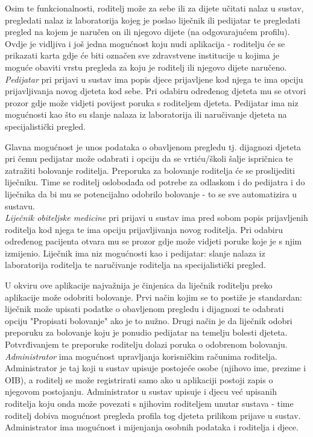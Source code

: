 		Osim te funkcionalnosti, roditelj može za sebe ili za dijete učitati nalaz u sustav, pregledati nalaz iz laboratorija kojeg je poslao liječnik ili pedijatar te pregledati pregled na kojem je naručen on ili njegovo dijete (na odgovarajućem profilu). Ovdje je vidljiva i još jedna mogućnost koju nudi aplikacija - roditelju će se prikazati karta gdje će biti označen sve zdravstvene institucije u kojima je moguće obaviti vrstu pregleda za koju je roditelj ili njegovo dijete naručeno.\\
		
		
		\textit{Pedijatar} pri prijavi u sustav ima popis djece prijavljene kod njega te ima opciju prijavljivanja novog djeteta kod sebe. Pri odabiru određenog djeteta mu se otvori prozor gdje može vidjeti povijest poruka s roditeljem djeteta. Pedijatar ima niz mogućnosti kao što su slanje nalaza iz laboratorija ili naručivanje djeteta na specijalistički pregled. 
		
		Glavna mogućnost je unos podataka o obavljenom pregledu tj. dijagnozi djeteta pri čemu pedijatar može odabrati i opciju da se vrtiću/školi šalje ispričnica te zatražiti bolovanje roditelja. Preporuka za bolovanje roditelja će se proslijediti liječniku. Time se roditelj oslobodađa od potrebe za odlaskom i do pedijatra i do liječnika da bi mu se potencijalno odobrilo bolovanje - to se sve automatizira u sustavu.\\
		
		
		\textit{Liječnik obiteljske medicine} pri prijavi u sustav ima pred sobom popis prijavljenih roditelja kod njega te ima opciju prijavljivanja novog roditelja. Pri odabiru određenog pacijenta otvara mu se prozor gdje može vidjeti poruke koje je s njim izmijenio. Liječnik ima niz mogućnosti kao i pedijatar: slanje nalaza iz laboratorija roditelja te naručivanje roditelja na specijalistički pregled. 
		
		U okviru ove aplikacije najvažnija je činjenica da liječnik roditelju preko aplikacije može odobriti bolovanje. Prvi način kojim se to postiže je standardan: liječnik može upisati podatke o obavljenom pregledu i dijagnozi te odabrati opciju "Propisati bolovanje" ako je to nužno. Drugi način je da liječnik odobri preporuku za bolovanje koju je ponudio pedijatar na temelju bolesti djeteta. Potvrđivanjem te preporuke roditelju dolazi poruka o odobrenom bolovanju. \\
		
		
		\textit{Administrator} ima mogućnost upravljanja korisničkim računima roditelja. Administrator je taj koji u sustav upisuje postojeće osobe (njihovo ime, prezime i OIB), a roditelj se može registrirati samo ako u aplikaciji postoji zapis o njegovom postojanju. Administrator u sustav upisuje i djecu već upisanih roditelja koju onda može povezati s njihovim roditeljem unutar sustava - time roditelj dobiva mogućnost pregleda profila tog djeteta prilikom prijave u sustav. Administrator ima mogućnost i mijenjanja osobnih podataka i roditelja i djece.\\
		
